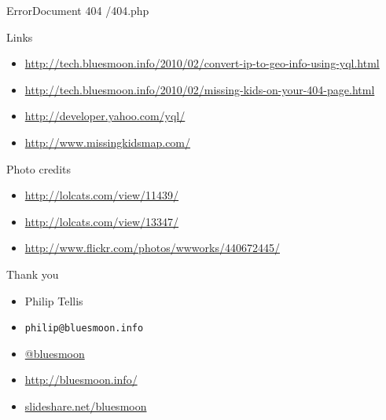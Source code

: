 \documentclass{beamer}
\begin{document}
\begin{frame}{ErrorDocument 404 /404.php}
\end{frame}

\begin{frame}{Links}
  \begin{itemize}
  \item \href{http://tech.bluesmoon.info/2010/02/convert-ip-to-geo-info-using-yql.html}{http://tech.bluesmoon.info/2010/02/convert-ip-to-geo-info-using-yql.html}
  \item \href{http://tech.bluesmoon.info/2010/02/missing-kids-on-your-404-page.html}{http://tech.bluesmoon.info/2010/02/missing-kids-on-your-404-page.html}
  \item \href{http://developer.yahoo.com/yql/}{http://developer.yahoo.com/yql/}
  \item \href{http://www.missingkidsmap.com/}{http://www.missingkidsmap.com/}
  \end{itemize}
\end{frame}

\begin{frame}{Photo credits}
  \begin{itemize}
  \item \href{http://lolcats.com/view/11439/}{http://lolcats.com/view/11439/}
  \item \href{http://lolcats.com/view/13347/}{http://lolcats.com/view/13347/}
  \item \href{http://www.flickr.com/photos/wwworks/440672445/}{http://www.flickr.com/photos/wwworks/440672445/}
  \end{itemize}
\end{frame}

\begin{frame}{Thank you}
  \begin{itemize}
  \item Philip Tellis
  \item \small{\texttt{philip@bluesmoon.info}}
  \item \href{http://twitter.com/bluesmoon}{@bluesmoon}
  \item \href{http://bluesmoon.info/}{http://bluesmoon.info/}
  \item \href{http://www.slideshare.net/bluesmoon}{slideshare.net/bluesmoon}
  \end{itemize}
\end{frame}
\end{document}
